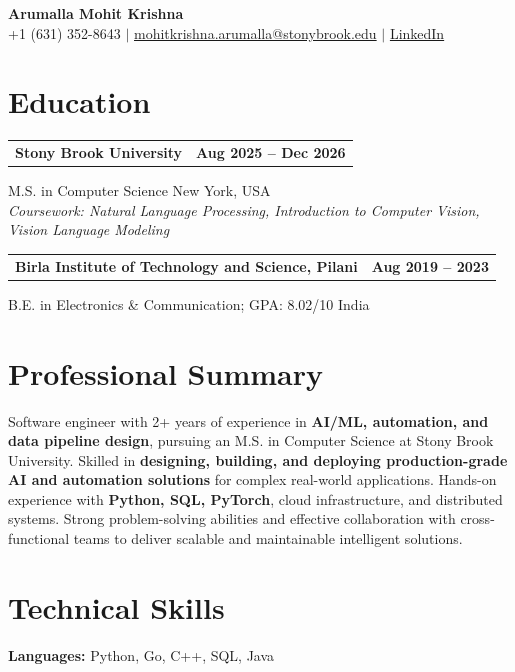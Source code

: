\documentclass[letterpaper,10pt]{article}
\makeatletter
\newcommand{\entry}[2]{%
  \noindent
  \begin{tabularx}{\linewidth}
    {@{}>{\raggedright\arraybackslash}X@{\hspace{6pt}}r@{}}
    \textbf{#1} & #2
  \end{tabularx}\par
}
\makeatother
\begin{document}
\begin{center}
    {\LARGE\bfseries Arumalla Mohit Krishna}\\[3pt]
    +1 (631) 352-8643 $|$
    \href{mailto:mohitkrishna.arumalla@stonybrook.edu}
    {mohitkrishna.arumalla@stonybrook.edu} $|$
    \href{https://linkedin.com/in/mohit-krishna-arumalla}
    {LinkedIn}
\end{center}
\vspace{-8pt}

\section{Education}

\entry
  {\textbf{Stony Brook University}}
  {\textbf{Aug 2025 -- Dec 2026}}

M.S. in Computer Science \hfill New York, USA\\
\textit{
Coursework: Natural Language Processing,
Introduction to Computer Vision, Vision Language Modeling
}
\vspace{3pt}

\entry
  {\textbf{Birla Institute of Technology and Science, Pilani}}
  {\textbf{Aug 2019 -- 2023}}

B.E. in Electronics \& Communication; GPA: 8.02/10 \hfill India
\section{Professional Summary}

Software engineer with 2+ years of experience in \textbf{AI/ML, automation, and data pipeline design}, pursuing an M.S. in Computer Science at Stony Brook University. Skilled in \textbf{designing, building, and deploying production-grade AI and automation solutions} for complex real-world applications. Hands-on experience with \textbf{Python, SQL, PyTorch}, cloud infrastructure, and distributed systems. Strong problem-solving abilities and effective collaboration with cross-functional teams to deliver scalable and maintainable intelligent solutions.

\section{Technical Skills}

\textbf{Languages:}
Python, Go, C++, SQL, Java\\
\end{document}
